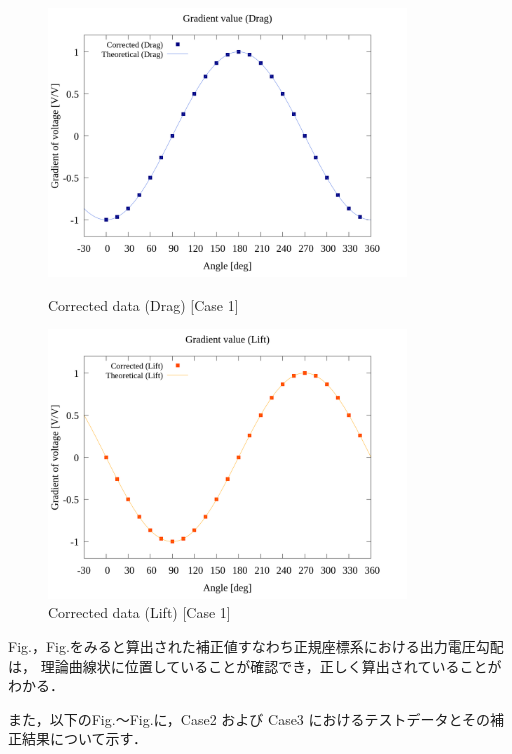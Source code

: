 \begin{figure}
    \footnotesize
    \begin{center}
        \includegraphics[width=95mm]{../../02_workspace/result/rotation_tx=15.0_tx=20.0/plot/21/21-4_corrected_angle_drag.png}
        \caption{Corrected data (Drag) [Case 1]}
        \includegraphics[width=95mm]{../../02_workspace/result/rotation_tx=15.0_tx=20.0/plot/21/21-4_corrected_angle_lift.png}
        \caption{Corrected data (Lift) [Case 1]}
    \end{center}
\end{figure}

\newpage

Fig.，Fig.をみると算出された補正値すなわち正規座標系における出力電圧勾配は，
理論曲線状に位置していることが確認でき，正しく算出されていることがわかる．

\newpage
また，以下のFig.～Fig.に，Case2 および Case3 におけるテストデータとその補正結果について示す．

